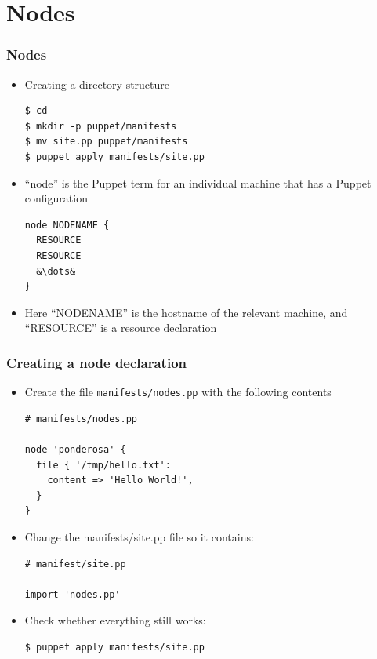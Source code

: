 \documentclass{beamer}
\begin{document}
\section{Nodes}
\begin{frame}[fragile]
\frametitle{Nodes}
\begin{itemize}
\item Creating a directory structure
\lstset{language=shell}
\begin{lstlisting}[escapechar=&]
$ cd
$ mkdir -p puppet/manifests
$ mv site.pp puppet/manifests
$ puppet apply manifests/site.pp
\end{lstlisting}

\item ``node'' is the Puppet term for an individual machine that has a Puppet configuration

\lstset{language=shell}
\begin{lstlisting}[escapechar=&]
node NODENAME {
  RESOURCE
  RESOURCE
  &\dots&
}
\end{lstlisting}
\item Here ``NODENAME'' is the hostname of the relevant machine, and ``RESOURCE'' is a resource
declaration
\end{itemize}
\end{frame}
\begin{frame}[fragile]
\frametitle{Creating a node declaration}
\begin{itemize}
\item Create the file \texttt{manifests/nodes.pp} with the following contents
\lstset{language=shell}
\begin{lstlisting}[escapechar=&]
# manifests/nodes.pp

node 'ponderosa' {
  file { '/tmp/hello.txt':
    content => 'Hello World!',
  }
}
\end{lstlisting}
\item Change the manifests/site.pp file so it contains:
\lstset{language=shell}
\begin{lstlisting}[escapechar=&]
# manifest/site.pp

import 'nodes.pp'
\end{lstlisting}

\item Check whether everything still works:
\lstset{language=shell}
\begin{lstlisting}[escapechar=&]
$ puppet apply manifests/site.pp
\end{lstlisting}

\end{itemize}
\end{frame}
\end{document}
